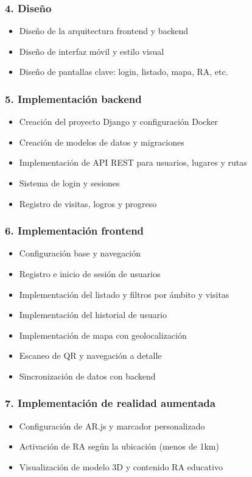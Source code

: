 \subsubsection*{4. Diseño}
\begin{itemize}
  \item Diseño de la arquitectura frontend y backend
  \item Diseño de interfaz móvil y estilo visual
  \item Diseño de pantallas clave: login, listado, mapa, RA, etc.
\end{itemize}

\subsubsection*{5. Implementación backend}
\begin{itemize}
  \item Creación del proyecto Django y configuración Docker
  \item Creación de modelos de datos y migraciones
  \item Implementación de API REST para usuarios, lugares y rutas
  \item Sistema de login y sesiones
  \item Registro de visitas, logros y progreso
\end{itemize}

\subsubsection*{6. Implementación frontend}
\begin{itemize}
  \item Configuración base y navegación
  \item Registro e inicio de sesión de usuarios
  \item Implementación del listado y filtros por ámbito y visitas
  \item Implementación del historial de usuario
  \item Implementación de mapa con geolocalización
  \item Escaneo de QR y navegación a detalle
  \item Sincronización de datos con backend
\end{itemize}

\subsubsection*{7. Implementación de realidad aumentada}
\begin{itemize}
  \item Configuración de AR.js y marcador personalizado
  \item Activación de RA según la ubicación (menos de 1km)
  \item Visualización de modelo 3D y contenido RA educativo
\end{itemize}

